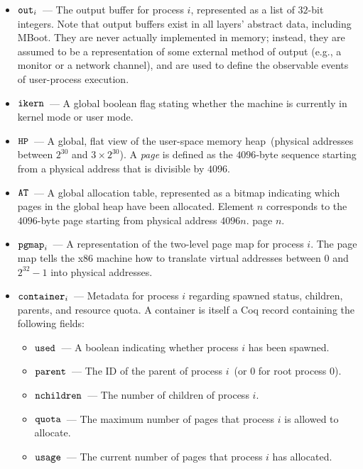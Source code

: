 \begin{itemize}
\item $\text{\tt{out}}_i$~--- The output buffer for process $i$\ifextended,
represented as a list of $32$-bit integers\else\fi.
Note that output buffers
exist in all layers' abstract data, including MBoot. They are
never actually implemented in memory; instead, they are assumed to be
a representation of some external method of output (e.g., a monitor
or a network channel), and are used to define the observable
events of user-process execution.
\ifextended
\item $\text{\tt{ikern}}$~--- A global boolean flag stating whether
the machine is currently in kernel mode or user mode.
\else\fi
\item $\text{\tt{HP}}$~--- A global, flat view of the user-space
memory heap\ifextended~(physical addresses between $2^{30}$ and 
$3 \times 2^{30}$)\else\fi.
A \emph{page} is defined as the $4096$-byte sequence starting 
from a physical address that is divisible by $4096$.
\item $\text{\tt{AT}}$~--- A global allocation table, represented as
a bitmap indicating which pages in the global heap have been 
allocated. Element $n$ corresponds to 
\ifextended
the $4096$-byte page starting from physical address $4096n$.
\else page $n$. 
\fi
\item $\text{\tt{pgmap}}_i$~--- A representation of the two-level page 
map for process $i$. The page map tells the x86 machine how
to translate virtual addresses between $0$ and $2^{32} - 1$ into 
physical addresses.
\item $\text{\tt{container}}_i$~--- Metadata for process $i$
regarding spawned status, children,
parents, and resource quota. A container is itself a 
Coq record containing the following fields:
\begin{itemize}
\item $\text{\tt{used}}$~--- A boolean indicating whether process $i$ has
been spawned.
\item $\text{\tt{parent}}$~--- The ID of the parent of process 
$i$\ifextended~(or $0$ for root process $0$)\else\fi.
\item $\text{\tt{nchildren}}$~--- The number of children of process $i$.
\item $\text{\tt{quota}}$~--- The maximum number of pages that process
$i$ is allowed to allocate.
\item $\text{\tt{usage}}$~--- The current number of pages that process
$i$ has allocated.
\end{itemize}

\end{itemize}
